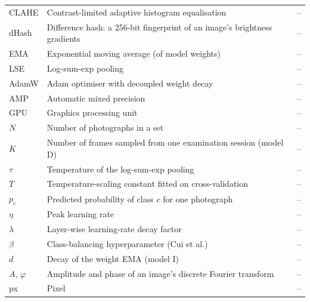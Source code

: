 \begin{longtable}{@{}p{30mm}p{95mm}p{25mm}@{}}
CLAHE & Contrast-limited adaptive histogram equalisation & --\\
dHash & Difference hash: a 256-bit fingerprint of an image's brightness gradients & --\\
EMA & Exponential moving average (of model weights) & --\\
LSE & Log-sum-exp pooling & --\\
AdamW & Adam optimiser with decoupled weight decay & --\\
AMP & Automatic mixed precision & --\\
GPU & Graphics processing unit & --\\
$N$ & Number of photographs in a set & --\\
$K$ & Number of frames sampled from one examination session (model D) & --\\
$\tau$ & Temperature of the log-sum-exp pooling & --\\
$T$ & Temperature-scaling constant fitted on cross-validation & --\\
$p_c$ & Predicted probability of class $c$ for one photograph & --\\
$\eta$ & Peak learning rate & --\\
$\lambda$ & Layer-wise learning-rate decay factor & --\\
$\beta$ & Class-balancing hyperparameter (Cui et al.) & --\\
$d$ & Decay of the weight EMA (model I) & --\\
$A$, $\varphi$ & Amplitude and phase of an image's discrete Fourier transform & --\\
px & Pixel & --\\
\bottomrule\end{longtable}\endgroup
\clearpage
